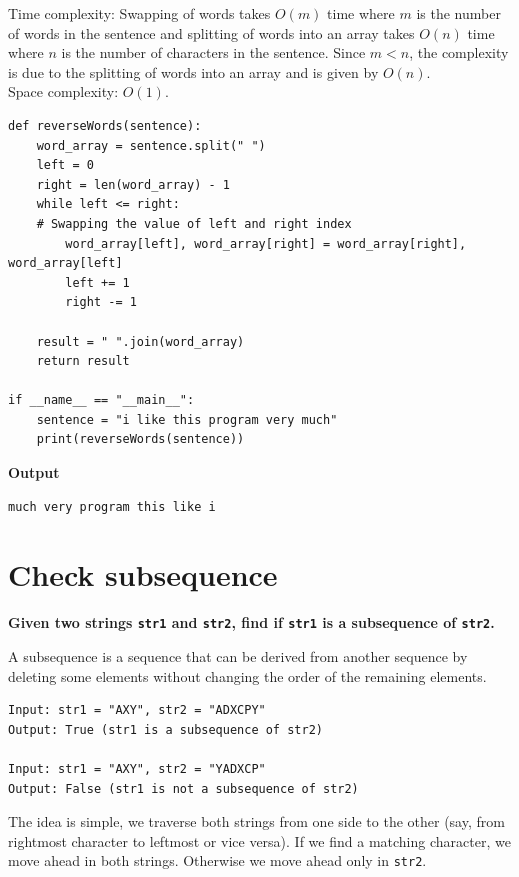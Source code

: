 \documentclass[a4paper,11pt]{book}
\begin{document}
\vspace{5mm}

\noindent Time complexity: Swapping of words takes $O(m)$ time where $m$ is the number of words in the sentence and splitting of words into an array takes $O(n)$ time where $n$ is the number of characters in the sentence. Since $m<n$, the complexity is due to the splitting of words into an array and is given by $O(n)$.\\
\noindent Space complexity: $O(1)$.
\begin{lstlisting}
def reverseWords(sentence):
    word_array = sentence.split(" ")
    left = 0
    right = len(word_array) - 1
    while left <= right:
    # Swapping the value of left and right index
        word_array[left], word_array[right] = word_array[right], word_array[left]
        left += 1
        right -= 1

    result = " ".join(word_array)
    return result

if __name__ == "__main__":
    sentence = "i like this program very much"
    print(reverseWords(sentence))
\end{lstlisting}
\textbf{Output}
\begin{lstlisting}
much very program this like i
\end{lstlisting}

\newpage
\section{Check subsequence}
\label{section:check_subsequence}
\noindent \textbf{Given two strings \lstinline{str1} and \lstinline{str2}, find if \lstinline{str1} is a subsequence of \lstinline{str2}.}
\vspace{5mm}

\noindent A subsequence is a sequence that can be derived from another sequence by deleting some elements without changing the order of the remaining elements.

\begin{lstlisting}
Input: str1 = "AXY", str2 = "ADXCPY"
Output: True (str1 is a subsequence of str2)

Input: str1 = "AXY", str2 = "YADXCP"
Output: False (str1 is not a subsequence of str2)
\end{lstlisting}

\noindent The idea is simple, we traverse both strings from one side to the other (say, from rightmost character to leftmost or vice versa). If we find a matching character, we move ahead in both strings. Otherwise we move ahead only in \lstinline{str2}.
\vspace{4mm}
\end{document}
